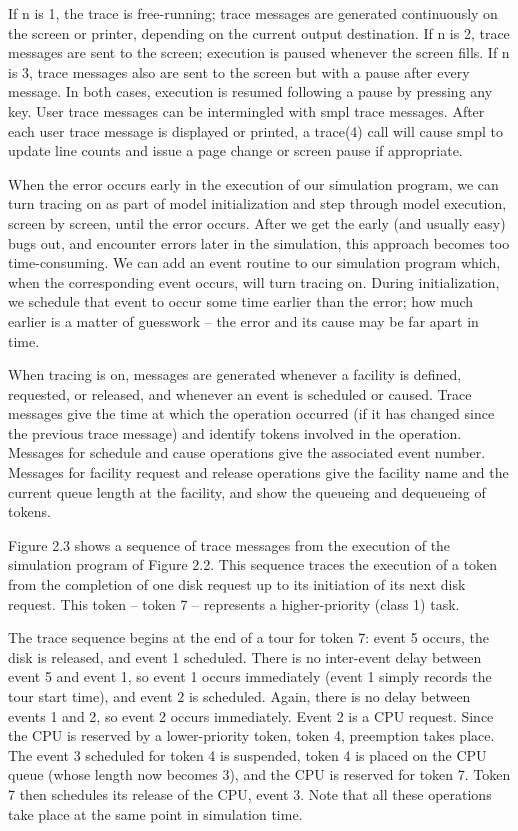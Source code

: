 If n is 1, the trace is free-running; trace messages are generated
continuously on the screen or printer, depending on the current output
destination. If n is 2, trace messages are sent to the screen; execution is
paused whenever the screen fills. If n is 3, trace messages also are sent to
the screen but with a pause after every message. In both cases, execution is
resumed following a pause by pressing any key. User trace messages can be
intermingled with smpl trace messages. After each user trace message is
displayed or printed, a trace(4) call will cause smpl to update line counts and
issue a page change or screen pause if appropriate.

When the error occurs early in the execution of our simulation program, we can
turn tracing on as part of model initialization and step through model
execution, screen by screen, until the error occurs. After we get the early
(and usually easy) bugs out, and encounter errors later in the simulation,
this approach becomes too time-consuming. We can add an event routine to our
simulation program which, when the corresponding event occurs, will turn
tracing on. During initialization, we schedule that event to occur some time
earlier than the error; how much earlier is a matter of guesswork -- the error
and its cause may be far apart in time.

When tracing is on, messages are generated whenever a facility is defined,
requested, or released, and whenever an event is scheduled or caused. Trace
messages give the time at which the operation occurred (if it has changed
since the previous trace message) and identify tokens involved in the
operation. Messages for schedule and cause operations give the associated
event number. Messages for facility request and release operations give the
facility name and the current queue length at the facility, and show the
queueing and dequeueing of tokens.

Figure 2.3 shows a sequence of trace messages from the execution of the
simulation program of Figure 2.2. This sequence traces the execution of a
token from the completion of one disk request up to its initiation of its next
disk request. This token -- token 7 -- represents a higher-priority (class 1)
task.

The trace sequence begins at the end of a tour for token 7: event 5 occurs, the
disk is released, and event 1 scheduled. There is no inter-event delay between
event 5 and event 1, so event 1 occurs immediately (event 1 simply records the
tour start time), and event 2 is scheduled. Again, there is no delay between
events 1 and 2, so event 2 occurs immediately. Event 2 is a CPU request. Since
the CPU is reserved by a lower-priority token, token 4, preemption takes
place. The event 3 scheduled for token 4 is suspended, token 4 is placed on
the CPU queue (whose length now becomes 3), and the CPU is reserved for token
7. Token 7 then schedules its release of the CPU, event 3. Note that all these
operations take place at the same point in simulation time.

